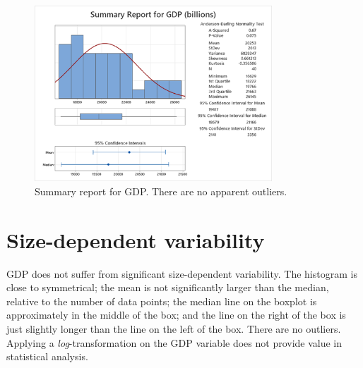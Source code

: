 \documentclass[12pt]{article}
\begin{document}
\begin{figure}
\begin{center}
\includegraphics[width=3.5in]{images/gdp-summary.png}
\end{center}
\caption{Summary report for GDP. There are no apparent outliers.\label{fig:gdpsummary}}
\end{figure}
\section{Size-dependent variability}
GDP does not suffer from significant size-dependent variability. The histogram is close to symmetrical; the mean is not significantly larger than the median, relative to the number of data points; the median line on the boxplot is approximately in the middle of the box; and the line on the right of the box is just slightly longer than the line on the left of the box. There are no outliers. Applying a \emph{log}-transformation on the GDP variable does not provide value in statistical analysis.
\end{document}
